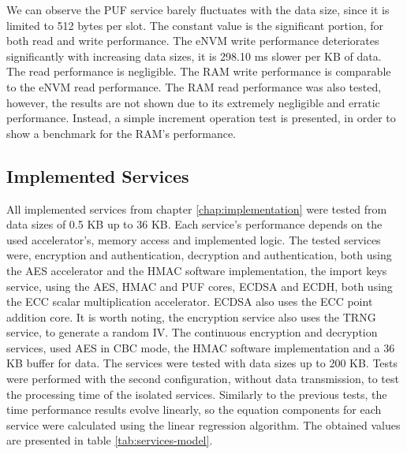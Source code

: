 

We can observe the PUF service barely fluctuates with the data size, since it is limited to 512 bytes per slot. The constant value is the significant portion, for both read and write performance.
The eNVM write performance deteriorates significantly with increasing data sizes, it is 298.10 ms slower per KB of data. The read performance is negligible.
The RAM write performance is comparable to the eNVM read performance. The RAM read performance was also tested, however, the results are not shown due to its extremely negligible and erratic performance. Instead, a simple increment operation test is presented, in order to show a benchmark for the RAM's performance.

\subsection{Implemented Services}\label{chap:evaluation:services}

All implemented services from chapter \ref{chap:implementation} were tested from data sizes of 0.5 KB up to 36 KB. Each service's performance depends on the used accelerator's, memory access and implemented logic.
The tested services were, encryption and authentication, decryption and authentication, both using the AES accelerator and the HMAC software implementation, the import keys service, using the AES, HMAC and PUF cores, ECDSA and ECDH, both using the ECC scalar multiplication accelerator. ECDSA also uses the ECC point addition core. It is worth noting, the encryption service also uses the TRNG service, to generate a random IV. The continuous encryption and decryption services, used AES in CBC mode, the HMAC software implementation and a 36 KB buffer for data. The services were tested with data sizes up to 200 KB.
Tests were performed with the second configuration, without data transmission, to test the processing time of the isolated services.
Similarly to the previous tests, the time performance results evolve linearly, so the equation components for each service were calculated using the linear regression algorithm. The obtained values are presented in table \ref{tab:services-model}.



